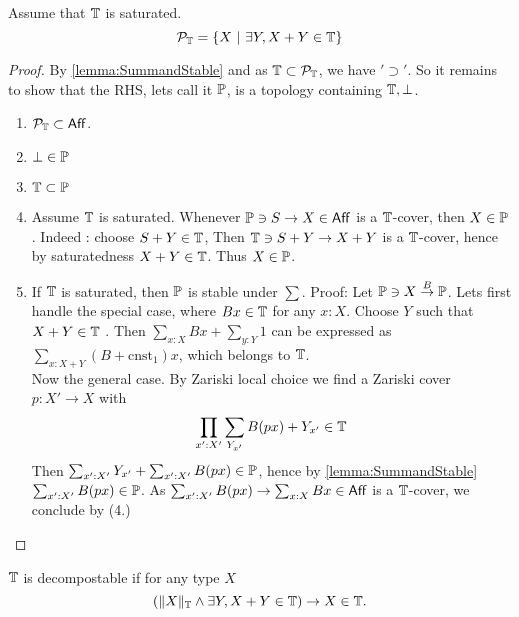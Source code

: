 \begin{prop}
	Assume that $\mathbb{T}$ is saturated. 	
	\[
	\mathcal{P}_{\mathbb{T}}= \{X  \ | \ \exists Y , X + Y \in \mathbb{T}\}
	\]
\end{prop}
\begin{proof}
	By \ref{lemma:SummandStable} and as $\mathbb{T} \subset \mathcal{P}_{\mathbb{T}}$, we have $'\supset'$. So it remains to show that the RHS, lets call it $\mathbb{P}$, is a topology containing $\mathbb{T}, \bot$.
%
\begin{enumerate}
	
	\item $\mathcal{P}_{\mathbb{T}} \subset \mathsf{Aff}$.
	\item $\bot \in \mathbb{P}$
	\item $\mathbb{T} \subset \mathbb{P}$
	\item Assume $\mathbb{T}$ is saturated. Whenever $\mathbb{P} \ni S \to X \in \mathsf{Aff}$ is a $\mathbb{T}$-cover, then $X \in \mathbb{P}$. Indeed : choose $S + Y \in \mathbb{T}$, Then $\mathbb{T} \ni S + Y \to X + Y$ is a $\mathbb{T}$-cover, hence by saturatedness $X + Y \in \mathbb{T}$. Thus $X \in \mathbb{P}$.
	\item If $\mathbb{T}$ is saturated, then $\mathbb{P}$ is stable under $\sum$. Proof:
	Let $\mathbb{P} \ni X \overset{B}{\to} \mathbb{P}$. Lets first handle the special case, where $B x \in \mathbb{T}$ for any $x : X$. Choose $Y$ such that $X + Y \in \mathbb{T}$ . Then $\sum_{x: X} B x + \sum_{y:Y} 1$ can be expressed as $\sum_{x : X + Y} (B + \mathrm{cnst}_1) x$, which belongs to $\mathbb{T}$. \\	 
	Now the general case. By Zariski local choice we find a Zariski cover $p : X' \to X$ with 
	\[
	\prod_{x' : X'} \sum_{Y_{x'}} B (p x) + Y_{x'} \in \mathbb{T}
	\]
	Then $\sum_{x' : X'} Y_{x'} + \sum_{x' : X'} B (p x) \in \mathbb{P}$, hence by \ref{lemma:SummandStable} $\sum_{x': X'} B (p x) \in \mathbb{P}$. As $\sum_{x': X'} B (p x) \to \sum_{x: X} B x \in \mathsf{Aff}$ is a $\mathbb{T}$-cover, we conclude by (4.)
\end{enumerate}
\end{proof}

\begin{definition}
	$\mathbb{T}$ is decompostable if for any type $X$
	\[ \left(\|X\|_{\mathbb{T}} \land \exists Y , X + Y \in \mathbb{T}  \right) \to X \in \mathbb{T}. \]\\ 

\end{definition}

